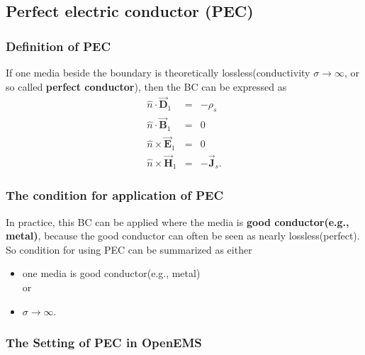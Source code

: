     \subsection{Perfect electric conductor (PEC)}\label{subsec:PEC}
    \subsubsection{Definition of PEC}
    If one media beside the boundary is theoretically lossless(conductivity $\sigma\rightarrow\infty$, or so called \textbf{perfect conductor}), then the BC can be expressed as
	    \begin{eqnarray}
		\hat{n}\cdot\vec{\mathbf{D}}_1 &=&-\rho_s  \\
		\hat{n}\cdot\vec{\mathbf{B}}_1 &=&0  \\
		\hat{n}\times\vec{\mathbf{E}}_1 &=&0\\
		\hat{n}\times\vec{\mathbf{H}}_1 &=&-\vec{\mathbf{J}}_s .
		\label{eq:PEC boundary conditions}
	    \end{eqnarray}
    \subsubsection{The condition for application of PEC}
    In practice, this BC can be applied where the media  is \textbf{good conductor(e.g., metal)}, because the good conductor can often be seen as nearly lossless(perfect). So condition for using PEC can be summarized as either
    \begin{itemize}
    \item one media is good conductor(e.g., metal) \\
    or
    \item $\sigma\rightarrow\infty$.
    \end{itemize}
    \subsubsection{The Setting of PEC in OpenEMS}



